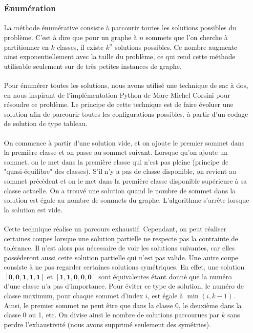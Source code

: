 \documentclass[12pt]{article}
\begin{document}
\subsubsection{Énumération}

\paragraph{}La méthode énumérative consiste à parcourir toutes les solutions possibles du problème. C'est à dire que pour un graphe à $n$ sommets que l'on cherche à partitionner en $k$ classes, il existe $k^n$ solutions possibles. Ce nombre augmente ainsi exponentiellement avec la taille du problème, ce qui rend cette méthode utilisable seulement sur de très petites instances de graphe.

\paragraph{}Pour énumérer toutes les solutions, nous avons utilisé une technique de sac à dos, en nous inspirant de l'implémentation Python de Marc-Michel Corsini pour résoudre ce problème. Le principe de cette technique est de faire évoluer une solution afin de parcourir toutes les configurations possibles, à partir d'un codage de solution de type tableau.

\paragraph{}On commence à partir d'une solution vide, et on ajoute le premier sommet dans la première classe et on passe au sommet suivant. Lorsque qu'on ajoute un sommet, on le met dans la première classe qui n'est pas pleine (principe de "quasi-équilibre" des classes). S'il n'y a pas de classe disponible, on revient au sommet précédent et on le met dans la première classe disponible supérieure à sa classe actuelle. On a trouvé une solution quand le nombre de sommet dans la solution est égale au nombre de sommets du graphe. L'algorithme s'arrête lorsque la solution est vide.

\paragraph{}Cette technique réalise un parcours exhaustif. Cependant, on peut réaliser certaines coupes lorsque une solution partielle ne respecte pas la contrainte de tolérance. Il n'est alors pas nécessaire de voir les solutions suivantes, car elles posséderont aussi cette solution partielle qui n'est pas valide. Une autre coupe consiste à ne pas regarder certaines solutions symétriques. En effet, une solution $\mathbf{[0,0,1,1,1]}$ et $\mathbf{[1,1,0,0,0]}$ sont équivalentes étant donné que la numéro d'une classe n'a pas d'importance. Pour éviter ce type de solution, le numéro de classe maximum, pour chaque sommet d'index $i$, est égale à $\min\left(i,k-1\right)$. Ainsi, le premier sommet ne peut être que dans la classe 0, le deuxième dans la classe 0 ou 1, etc. On divise ainsi le nombre de solutions parcourues par $k$ sans perdre l'exhaustivité (nous avons supprimé seulement des symétries).
\end{document}
